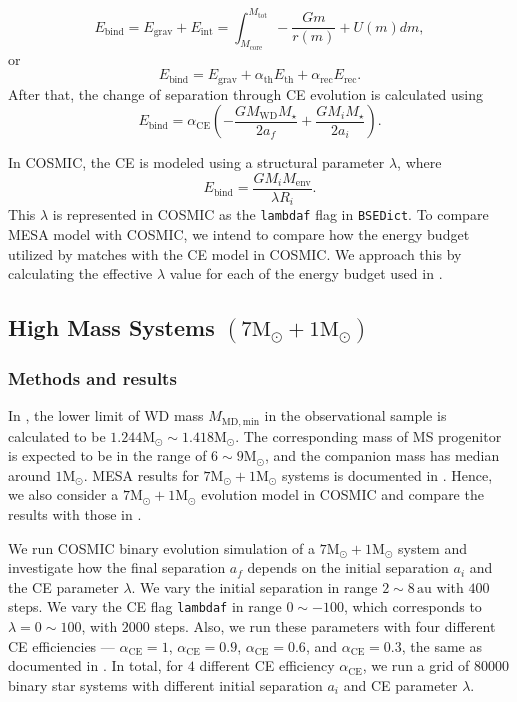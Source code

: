 \documentclass[linenumbers]{aastex631}
\newcommand{\Msun}{\mathrm{M_{\odot}}}
\newcommand{\MWD}{M_{\mathrm{WD}}}
\newcommand{\Mstar}{M_{\star}}
\newcommand{\alphace}{\alpha_{\mathrm{CE}}}
\newcommand{\alphath}{\alpha_{\mathrm{th}}}
\newcommand{\alpharec}{\alpha_{\mathrm{rec}}}
\newcommand{\Ebind}{E_{\mathrm{bind}}}
\newcommand{\au}{\, \mathrm{au}}
\begin{document}
\begin{equation}
	E_{\mathrm{bind}} = E_{\mathrm{grav}} + E_{\mathrm{int}} = \int_{M_{\mathrm{core}}}^{M_{\mathrm{tot}}} -\frac{Gm}{r(m)} + U(m) dm,
	\label{budget-int}
\end{equation}
or
\begin{equation}
	E_{\mathrm{bind}} = E_{\mathrm{grav}} + \alphath E_{\mathrm{th}} + \alpharec E_{\mathrm{rec}}.
	\label{budget-th-rec}
\end{equation}
After that, the change of separation through CE evolution is calculated using
\begin{equation}
	E_{\mathrm{bind}} = \alphace \left(-\frac{G\MWD \Mstar}{2a_f}+\frac{GM_i \Mstar}{2a_i}\right).
	\label{ebind-sep}
\end{equation}

In COSMIC, the CE is modeled using a structural parameter $\lambda$, where
\begin{equation}
	\Ebind = \frac{G M_i M_{\mathrm{env}}}{\lambda R_i}.   
	\label{ebind}
\end{equation}
This $\lambda$ is represented in COSMIC as the \verb|lambdaf| flag in \verb|BSEDict|. To compare MESA model with COSMIC, we intend to compare how the energy budget utilized by \cite{yamaguchi_hi, yamaguchi_lo} matches with the CE model in COSMIC. We approach this by calculating the effective $\lambda$ value for each of the energy budget used in \cite{yamaguchi_hi, yamaguchi_lo}. 

\subsection{High Mass Systems $(7 \Msun + 1 \Msun)$} \label{subsec:high}

\subsubsection{Methods and results}

In \cite{yamaguchi_hi}, the lower limit of WD mass $M_{\mathrm{MD, min}}$ in the observational sample is calculated to be $1.244\Msun \sim 1.418\Msun$. The corresponding mass of MS progenitor is expected to be in the range of $6 \sim 9 \Msun$, and the companion mass has median around $1\Msun$. MESA results for $7\Msun + 1\Msun$ systems is documented in \cite{yamaguchi_hi}. Hence, we also consider a $7\Msun + 1\Msun$ evolution model in COSMIC and compare the results with those in \cite{yamaguchi_hi}.

We run COSMIC binary evolution simulation of a $7\Msun + 1\Msun$ system and investigate how the final separation $a_f$ depends on the initial separation $a_i$ and the CE parameter $\lambda$. We vary the initial separation in range $2 \sim 8 \au$ with $400$ steps. We vary the CE flag \verb|lambdaf| in range $0 \sim -100$, which corresponds to $\lambda = 0 \sim 100$, with $2000$ steps. Also, we run these parameters with four different CE efficiencies — $\alphace = 1$, $\alphace = 0.9$, $\alphace = 0.6$, and $\alphace = 0.3$, the same as documented in \cite{yamaguchi_hi}. In total, for $4$ different CE efficiency $\alphace$, we run a grid of $80000$ binary star systems with different initial separation $a_i$ and CE parameter $\lambda$.
\end{document}
